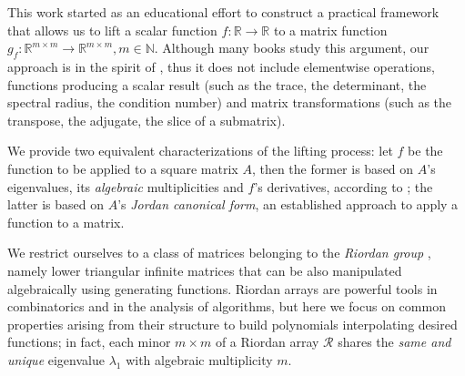 
This work started as an educational effort to construct a practical framework
that allows us to lift a scalar function $f: \mathbb{R}\rightarrow\mathbb{R}$
to a matrix function $g_{f}: \mathbb{R}^{m\times
m}\rightarrow\mathbb{R}^{m\times m}, m\in\mathbb{N}$. Although many books
\cite{Gantmacher1959, GL1996, HJ1991, LT1985} study this argument, our approach
is in the spirit of \cite{Higham2008}, thus it does not include elementwise
operations, functions producing a scalar  result (such as the trace, the
determinant, the spectral radius, the condition number) and matrix
transformations (such as the transpose, the adjugate, the slice of a
submatrix).

We provide two equivalent characterizations of the lifting process: let $f$ be
the function to be applied to a square matrix $A$, then the former is based on
$A$'s eigenvalues, its \textit{algebraic} multiplicities and $f$'s derivatives,
according to \cite{RUNCKEL1983161, VERDESTAR2005285}; the latter is
based on $A$'s \textit{Jordan canonical form}, an established approach to
apply a function to a matrix.

We restrict ourselves to a class of matrices belonging to the \textit{Riordan
group} \cite{MRSV97, SGWW91, Spr94, HE201515}, namely lower triangular infinite
matrices that can be also manipulated algebraically using generating functions.
Riordan arrays are powerful tools in combinatorics and in the analysis of
algorithms, but here we focus on common properties arising from their structure to
build polynomials interpolating desired functions; in fact, each minor $m\times
m$ of a Riordan array $\mathcal{R}$ shares the \textit{same and unique}
eigenvalue $\lambda_{1}$ with algebraic multiplicity $m$.

